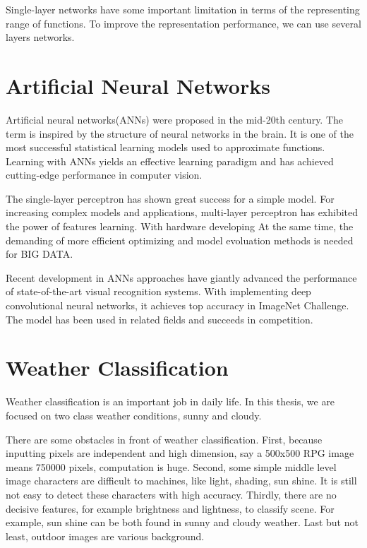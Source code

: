 Single-layer networks have some important limitation in terms of the representing range of functions. To improve the representation performance, we can use several layers networks. 

\section{Artificial Neural Networks}

Artificial neural networks(ANNs) were proposed in the mid-20th century. The term is inspired by the structure of neural networks in the brain. It is one of the most successful statistical learning models used to approximate functions. Learning with ANNs yields an effective learning paradigm and has achieved cutting-edge performance in computer vision. 

The single-layer perceptron  has shown great success for a simple model. For increasing complex models and applications, multi-layer perceptron has exhibited the power of features learning. With hardware developing At the same time, the demanding of more efficient optimizing and model evoluation methods is needed for BIG DATA. 

Recent development in ANNs approaches have giantly advanced the performance of state-of-the-art visual recognition systems. With implementing deep convolutional neural networks, it achieves top accuracy in ImageNet Challenge. The model has been used in related fields and succeeds in competition.

\section{Weather Classification}

Weather classification is an important job in daily life. In this thesis, we are focused on two class weather conditions, sunny and cloudy. 

There are some obstacles in front of weather classification. First, because inputting pixels are independent and high dimension, say a 500x500 RPG image means 750000 pixels, computation is huge. Second, some simple middle level image characters are difficult to machines, like light, shading, sun shine. It is still not easy to detect these characters with high accuracy.  Thirdly, there are no decisive features, for example brightness and lightness, to classify scene. For example, sun shine can be both found in sunny and cloudy weather. Last but not least, outdoor images are various background.



